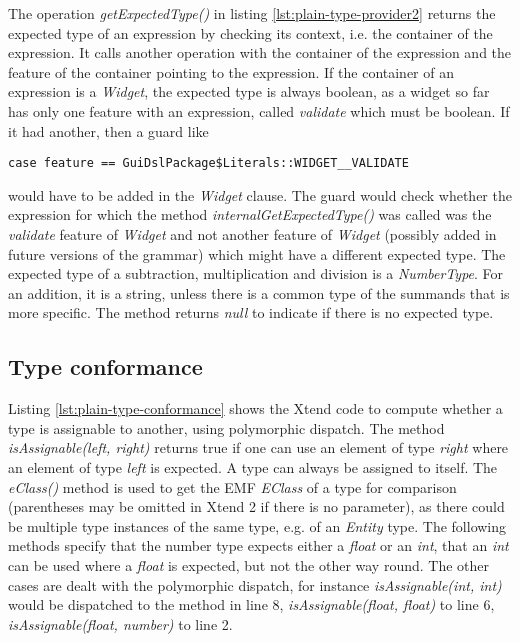The operation \emph{getExpectedType()} in listing \ref{lst:plain-type-provider2} returns the expected type of an expression by checking its context, i.e. the container of the expression. It calls another operation with the container of the expression and the feature of the container pointing to the expression. If the container of an expression is a \emph{Widget}, the expected type is always boolean, as a widget so far has only one feature with an expression, called \emph{validate} which must be boolean. If it had another, then a guard like

\verb|case feature == GuiDslPackage$Literals::WIDGET__VALIDATE| %

\noindent would have to be added in the \emph{Widget} clause. The guard would check whether the expression for which the method \emph{internalGetExpectedType()} was called was the \emph{validate} feature of \emph{Widget} and not another feature of \emph{Widget} (possibly added in future versions of the grammar) which might have a different expected type. The expected type of a subtraction, multiplication and division is a \emph{NumberType}. For an addition, it is a string, unless there is a common type of the summands that is more specific. The method returns \emph{null} to indicate if there is no expected type.



\subsection{Type conformance}
Listing \ref{lst:plain-type-conformance} shows the Xtend code to compute whether a type is assignable to another, using polymorphic dispatch. The method \emph{isAssignable(left, right)} returns true if one can use an element of type \emph{right} where an element of type \emph{left} is expected. A type can always be assigned to itself. The \emph{eClass()} method is used to get the EMF \emph{EClass} of a type for comparison (parentheses may be omitted in Xtend 2 if there is no parameter), as there could be multiple type instances of the same type, e.g. of an \emph{Entity} type.
The following methods specify that the number type expects either a \emph{float} or an \emph{int}, that an \emph{int} can be used where a \emph{float} is expected, but not the other way round. The other cases are dealt with the polymorphic dispatch, for instance \emph{isAssignable(int, int)} would be dispatched to the method in line 8, \emph{isAssignable(float, float)} to line 6, \emph{isAssignable(float, number)} to line 2.

